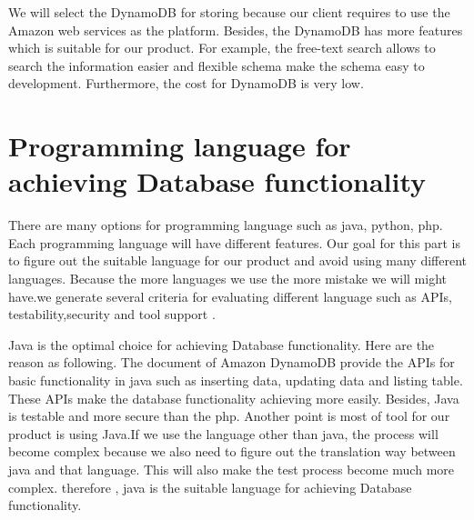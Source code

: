 \documentclass[10pt,draftclsnofoot,onecolumn,journal,compsoc]{IEEEtran}
\begin{document}
        \noindent We will select the DynamoDB for storing because our client requires to use the Amazon web services as the platform. Besides, the DynamoDB has more features which is suitable for our product. For example, the free-text search allows to search the information easier and flexible schema make the schema easy to development. Furthermore, the cost for DynamoDB is very low.
        \section{Programming language for achieving Database functionality}
        There are many options for programming language such as java, python, php. Each programming language will have different features. Our goal for this part is to figure out the suitable language for our product and avoid using many different languages. Because the more languages we use the more mistake we will might have.we generate several criteria for evaluating different language such as APIs, testability,security and tool support .

        \begin{table}[ht]
        \end{table}
                
        \noindent Java is the optimal choice for achieving Database functionality. Here are the reason as following. The document of Amazon DynamoDB provide the APIs for basic functionality in java such as inserting data, updating data and listing table. These APIs make the database functionality achieving more easily. Besides, Java is testable and more secure than the php. Another point is most of tool for our product is using Java.If we use the language other than java, the process will become complex because we also need to figure out the translation way  between java and that language. This will also make the test process become much more complex. therefore , java is the suitable language for achieving Database functionality.
\end{document}
